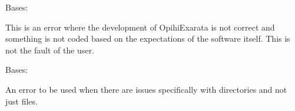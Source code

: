\documentclass[letterpaper,11pt,english]{sphinxmanual}
\begin{document}
\begin{savenotes}\begin{fulllineitems}
\label{\detokenize{code/opihiexarata.library.error:opihiexarata.library.error.DevelopmentError}}
\pysigstartsignatures
{}
\pysigstopsignatures
\sphinxAtStartPar
Bases: {\hyperref[\detokenize{code/opihiexarata.library.error:opihiexarata.library.error.ExarataBaseException}]{}}

\sphinxAtStartPar
This is an error where the development of OpihiExarata is not correct and
something is not coded based on the expectations of the software itself.
This is not the fault of the user.

\end{fulllineitems}\end{savenotes}


\begin{savenotes}\begin{fulllineitems}
\label{\detokenize{code/opihiexarata.library.error:opihiexarata.library.error.DirectoryError}}
\pysigstartsignatures
{}
\pysigstopsignatures
\sphinxAtStartPar
Bases: {\hyperref[\detokenize{code/opihiexarata.library.error:opihiexarata.library.error.ExarataException}]{}}

\sphinxAtStartPar
An error to be used when there are issues specifically with directories
and not just files.

\end{fulllineitems}\end{savenotes}

\end{document}
